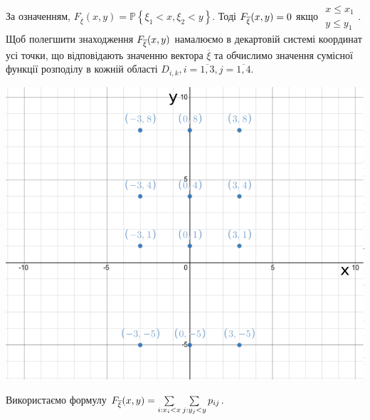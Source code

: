 \documentclass[14pt,a4paper]{scrartcl}
\theoremstyle{definition}
\theoremstyle{remark}
\theoremstyle{definition}
\theoremstyle{definition}
\begin{document}
За означенням, $ F_{\overline{\xi}} (x,y) = \mathbb{P} \left\lbrace  \xi_1 < x, \xi_2 < y \right\rbrace$. Тоді $F_{\overline{\xi}}(x,y) = 0 $ якщо $\begin{gathered}
 x \leq x_1 \\
 y \leq y_1
\end{gathered}$.\\
Щоб полегшити знаходження $F_{\overline{\xi}} (x,y)$ намалюємо в декартовій
системі координат усі точки, що
відповідають значенню вектора $ \overline{\xi}$ та обчислимо значення
сумісної функції розподілу в кожній
області $D_{i,k}, i = \overline{1,3}, j = \overline{1,4}$.
\begin{center} \includegraphics[scale=0.5]{assets/5.png} \end{center}
Використаємо формулу $ F_{\overline{\xi}} (x,y ) =  \sum\limits_{i: x_i < x}^{}{ \sum\limits_{j: y_j < y}^{}{ p_{ij}}}$.
\end{document}
